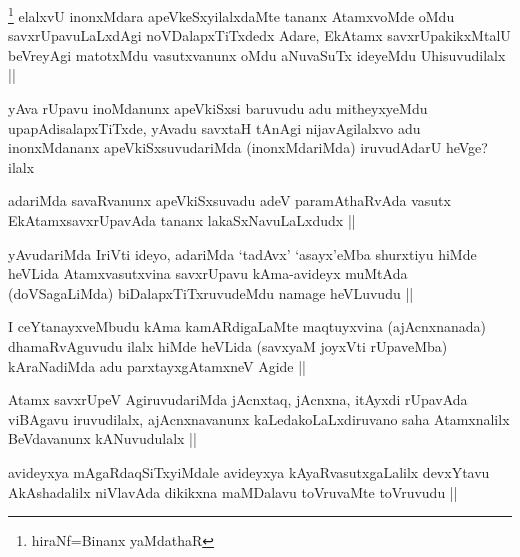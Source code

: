 \begin{artha}
\footnote{hiraNf=Binanx yaMdathaR}
elalxvU inonxMdara apeVkeSxyilalxdaMte tananx AtamxvoMde oMdu savxrUpavuLaLxdAgi noVDalapxTiTxdedx Adare, EkAtamx savxrUpakikxMtalU beVreyAgi matotxMdu vasutxvanunx oMdu aNuvaSuTx ideyeMdu Uhisuvudilalx ||
\end{artha}


\begin{artha}
yAva rUpavu inoMdanunx apeVkiSxsi baruvudu adu mitheyxyeMdu upapAdisalapxTiTxde, yAvadu savxtaH tAnAgi nijavAgilalxvo adu inonxMdananx apeVkiSxsuvudariMda (inonxMdariMda) iruvudAdarU heVge? ilalx
\end{artha}

\begin{artha}
adariMda savaRvanunx apeVkiSxsuvadu adeV paramAthaRvAda vasutx EkAtamxsavxrUpavAda tananx lakaSxNavuLaLxdudx ||
\end{artha}

\begin{artha}
yAvudariMda IriVti ideyo, adariMda `tadAvx' `asayx'eMba shurxtiyu hiMde heVLida Atamxvasutxvina savxrUpavu kAma-avideyx muMtAda (doVSagaLiMda) biDalapxTiTxruvudeMdu namage heVLuvudu ||
\end{artha}


\begin{artha}
I ceYtanayxveMbudu kAma kamARdigaLaMte maqtuyxvina (ajAcnxnanada) dhamaRvAguvudu ilalx hiMde heVLida (savxyaM joyxVti rUpaveMba) kAraNadiMda adu parxtayxgAtamxneV Agide ||
\end{artha}


\begin{artha}
Atamx savxrUpeV AgiruvudariMda jAcnxtaq, jAcnxna, itAyxdi rUpavAda viBAgavu iruvudilalx, ajAcnxnavanunx kaLedakoLaLxdiruvano saha Atamxnalilx BeVdavanunx kANuvudulalx ||
\end{artha}


\begin{artha}
avideyxya mAgaRdaqSiTxyiMdale avideyxya kAyaRvasutxgaLalilx devxYtavu AkAshadalilx niVlavAda dikikxna maMDalavu toVruvaMte toVruvudu ||
\end{artha}

